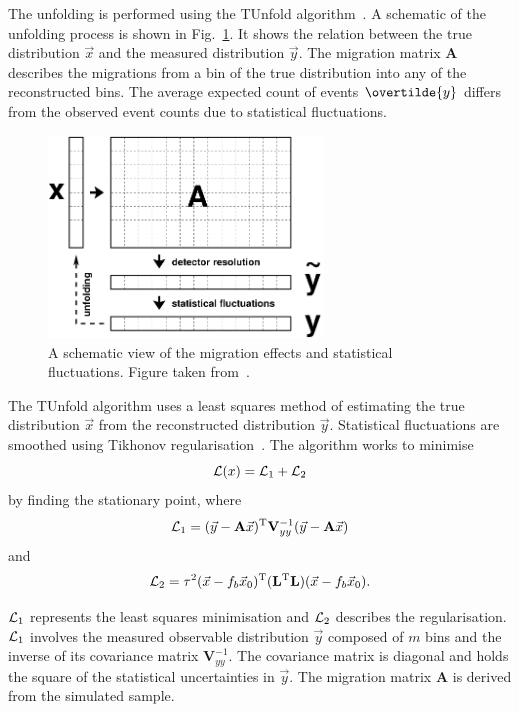 The unfolding is performed using the TUnfold algorithm~\cite{Unfold:TUnfold}. 
A schematic of the unfolding process is shown in Fig.~\ref{fig:migration}.
It shows the relation between the true distribution $\vec{x}$ and the measured distribution $\vec{y}$.
The migration matrix $\mathbf{A}$ describes the migrations from a bin of the true distribution into any of the reconstructed bins.
The average expected count of events $\overtilde{y}$ differs from the observed event counts due to statistical fluctuations.
\begin{figure}[htpb]
	\centering
	\includegraphics[width=0.65\textwidth]{Figures/Unfold_TUnfold.png}
	\caption[A schematic view of the migration effects and statistical fluctuations.]{A schematic view of the migration effects and statistical fluctuations. Figure taken from~\cite{Unfold:TUnfold}.}
	\label{fig:migration}
\end{figure}

The TUnfold algorithm uses a least squares method of estimating the true distribution $\vec{x}$ from the reconstructed distribution $\vec{y}$.
Statistical fluctuations are smoothed using Tikhonov regularisation~\cite{Unfold:Tikh1, Unfold:Tikh2}. 
The algorithm works to minimise 
\begin{equation*}
\mathcal{L}(x) = \mathcal{L}_{1}+\mathcal{L}_{2}
\end{equation*}
by finding the stationary point, where
\begin{equation*}
\mathcal{L}_{1} = (\vec{y}-\mathbf{A}\vec{x})^{\mathrm{T}} \mathbf{V}_{yy}^{-1} (\vec{y}-\mathbf{A}\vec{x})
\end{equation*}
and
\begin{equation*}
\mathcal{L}_{2} = \tau^{2}(\vec{x}-f_{b}\vec{x}_{0})^{\mathrm{T}} (\mathbf{L}^{\mathrm{T}}\mathbf{L}) (\vec{x}-f_{b}\vec{x}_{0}).
\end{equation*}

$\mathcal{L}_{1}$ represents the least squares minimisation and $\mathcal{L}_{2}$ describes the regularisation. 
$\mathcal{L}_{1}$ involves the measured observable distribution $\vec{y}$ composed of $m$ bins and the inverse of its covariance matrix $\mathbf{V}_{yy}^{-1}$.
The covariance matrix is diagonal and holds the square of the statistical uncertainties in $\vec{y}$.
The migration matrix $\mathbf{A}$ is derived from the simulated \powhegpythia{} sample.

